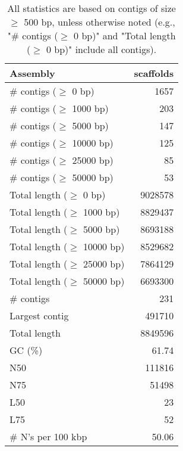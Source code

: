 \documentclass[12pt,a4paper]{article}
\begin{document}
\begin{table}[ht]
\begin{center}
\caption{All statistics are based on contigs of size $\geq$ 500 bp, unless otherwise noted (e.g., "\# contigs ($\geq$ 0 bp)" and "Total length ($\geq$ 0 bp)" include all contigs).}
\begin{tabular}{|l*{1}{|r}|}
\hline
Assembly & scaffolds \\ \hline
\# contigs ($\geq$ 0 bp) & 1657 \\ \hline
\# contigs ($\geq$ 1000 bp) & 203 \\ \hline
\# contigs ($\geq$ 5000 bp) & 147 \\ \hline
\# contigs ($\geq$ 10000 bp) & 125 \\ \hline
\# contigs ($\geq$ 25000 bp) & 85 \\ \hline
\# contigs ($\geq$ 50000 bp) & 53 \\ \hline
Total length ($\geq$ 0 bp) & 9028578 \\ \hline
Total length ($\geq$ 1000 bp) & 8829437 \\ \hline
Total length ($\geq$ 5000 bp) & 8693188 \\ \hline
Total length ($\geq$ 10000 bp) & 8529682 \\ \hline
Total length ($\geq$ 25000 bp) & 7864129 \\ \hline
Total length ($\geq$ 50000 bp) & 6693300 \\ \hline
\# contigs & 231 \\ \hline
Largest contig & 491710 \\ \hline
Total length & 8849596 \\ \hline
GC (\%) & 61.74 \\ \hline
N50 & 111816 \\ \hline
N75 & 51498 \\ \hline
L50 & 23 \\ \hline
L75 & 52 \\ \hline
\# N's per 100 kbp & 50.06 \\ \hline
\end{tabular}
\end{center}
\end{table}
\end{document}
